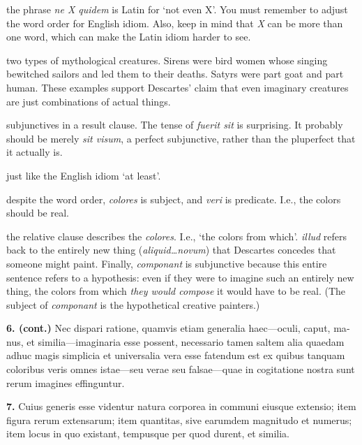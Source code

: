  the phrase \textit{ne X quidem} is Latin for `not even X'. You must remember to adjust the word order for English idiom. Also, keep in mind that \textit{X} can be more than one word, which can make the Latin idiom harder to see.

 two types of mythological creatures. Sirens were bird women whose singing bewitched sailors and led them to their deaths. Satyrs were part goat and part human. These examples support Descartes' claim that even imaginary creatures are just combinations of actual things.

 subjunctives in a result clause. The tense of \textit{fuerit sit} is surprising. It probably should be merely \textit{sit visum}, a perfect subjunctive, rather than the pluperfect that it actually is.

 just like the English idiom `at least'.

 despite the word order, \textit{colores} is subject, and \textit{veri} is predicate. I.e., the colors should be real.

 the relative clause describes the \textit{colores}. I.e., `the colors from which'. \textit{illud} refers back to the entirely new thing (\textit{aliquid\dots novum}) that Descartes concedes that someone might paint. Finally, \textit{componant} is subjunctive because this entire sentence refers to a hypothesis: even if they were to imagine such an entirely new thing, the colors from which \textit{they would compose} it would have to be real. (The subject of \textit{componant} is the hypothetical creative painters.)

\clearpage

\beginnumbering
\pstart
{}
\begin{latin}
    \textenglish{\textbf{6. (cont.)}} Nec dispari ratione, quamvis etiam generalia haec---oculi, caput, manus, et similia---imaginaria esse possent, necessario tamen saltem alia quaedam adhuc magis simplicia et universalia vera esse fatendum est ex quibus tanquam coloribus veris omnes istae---seu verae seu falsae---quae in cogitatione nostra sunt rerum imagines effinguntur.
\end{latin}
\pend
\endnumbering

\beginnumbering
\pstart
\begin{latin}
   \textenglish{\textbf{7.}} Cuius generis esse videntur natura corporea in communi eiusque extensio; item figura rerum extensarum; item quantitas, sive earumdem magnitudo et numerus; item locus in quo existant, tempusque per quod durent, et similia.
\end{latin}
\pend
\endnumbering

